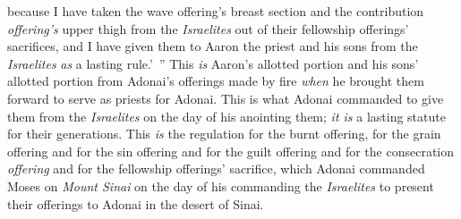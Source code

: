 \begin{biblechapter}
\verse because I have taken the wave offering’s breast section and the contribution \textit{offering’s} upper thigh from the \textit{Israelites} out of their fellowship offerings’ sacrifices, and I have given them to Aaron the priest and his sons from the \textit{Israelites} \textit{as} a lasting rule.’ ”
\verse This \textit{is} Aaron’s allotted portion and his sons’ allotted portion from Adonai’s offerings made by fire \textit{when} he brought them forward to serve as priests for Adonai.
\verse This is what Adonai commanded to give them from the \textit{Israelites} on the day of his anointing them; \textit{it is} a lasting statute for their generations.
 This \textit{is} the regulation for the burnt offering, for the grain offering and for the sin offering and for the guilt offering and for the consecration \textit{offering} and for the fellowship offerings’ sacrifice,
\verse which Adonai commanded Moses on \textit{Mount Sinai} on the day of his commanding the \textit{Israelites} to present their offerings to Adonai in the desert of Sinai.
\end{biblechapter}

